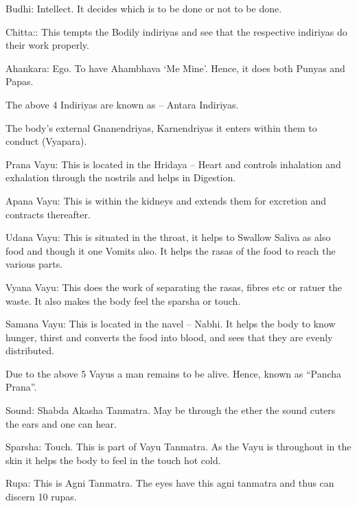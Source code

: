  \item Budhi: Intellect. It decides which is to be done or not to be done.

 \item Chitta:: This tempts the Bodily indiriyas and see that the respective indiriyas do their work properly.

 \item Ahankara: Ego. To have Ahambhava ‘Me Mine’. Hence, it does both Punyas and Papas.

The above 4 Indiriyas are known as – Antara Indiriyas.

The body's external Gnanendriyas, Karnendriyas it enters within them to conduct (Vyapara).

\item Prana Vayu: This is located in the Hridaya – Heart and controls inhalation and exhalation through the nostrils and helps in Digestion.

 \item Apana Vayu: This is within the kidneys and extends them for excretion and contracts thereafter.

 \item Udana Vayu: This is situated in the throat, it helps to Swallow Saliva as also food and though it one Vomits also. It helps the rasas of the food to reach the various parts.

 \item Vyana Vayu: This does the work of separating the rasas, fibres etc or ratuer the waste. It also makes the body feel the sparsha or touch.

 \item Samana Vayu: This is located in the navel – Nabhi. It helps the body to know hunger, thirst and converts the food into blood, and sees that they are evenly distributed.

Due to the above 5 Vayus a man remains to be alive. Hence, known as “Pancha Prana”.

\item Sound: Shabda Akasha Tanmatra. May be through the ether the sound cuters the ears and one can hear.

 \item Sparsha: Touch. This is part of Vayu Tanmatra. As the Vayu is throughout in the skin it helps the body to feel in the touch hot cold.

 \item Rupa: This is Agni Tanmatra. The eyes have this agni tanmatra and thus can discern 10 rupas.

